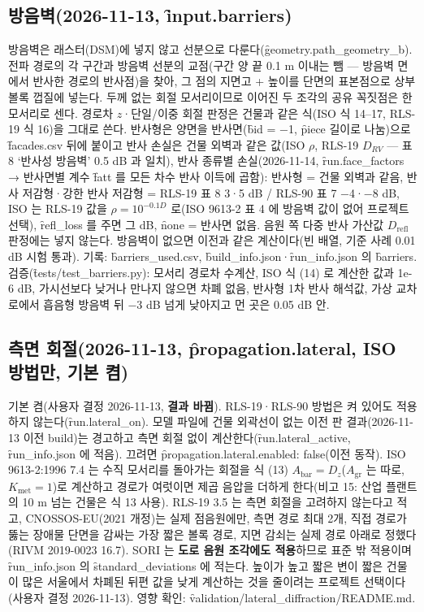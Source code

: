 \documentclass[10.5pt,a4paper]{article}
\begin{document}
\subsection{방음벽(2026-11-13, \f{input.barriers})}\label{sec:barrier}
방음벽은 래스터(DSM)에 넣지 않고 선분으로 다룬다(\f{geometry.path\_geometry\_b}). 전파 경로의 각 구간과 방음벽 선분의 교점(구간 양 끝 0.1 m 이내는 뺌 — 방음벽 면에서 반사한 경로의 반사점)을 찾아, 그 점의 지면고 + 높이를 단면의 표본점으로 상부 볼록 껍질에 넣는다. 두께 없는 회절 모서리이므로 이어진 두 조각의 공유 꼭짓점은 한 모서리로 센다. 경로차 $z$·단일/이중 회절 판정은 건물과 같은 식(ISO 식 14–17, RLS-19 식 16)을 그대로 쓴다. 반사형은 양면을 반사면(\f{bid} = −1, \f{piece} 길이로 나눔)으로 \f{facades.csv} 뒤에 붙이고 반사 손실은 건물 외벽과 같은 값(ISO $\rho$, RLS-19 $D_{RV}$ — 표 8 ‘반사성 방음벽’ 0.5 dB 과 일치), 반사 종류별 손실(2026-11-14, \f{run.face\_factors} → 반사면별 계수 \f{fatt} 를 모든 차수 반사 이득에 곱함): 반사형 = 건물 외벽과 같음, 반사 저감형·강한 반사 저감형 = RLS-19 표 8 3·5 dB / RLS-90 표 7 −4·−8 dB, ISO 는 RLS-19 값을 $\rho = 10^{-0.1 D}$ 로(ISO 9613-2 표 4 에 방음벽 값이 없어 프로젝트 선택), \f{refl\_loss} 를 주면 그 dB, \f{none} = 반사면 없음. 음원 쪽 다중 반사 가산값 $D_\mathrm{refl}$ 판정에는 넣지 않는다. 방음벽이 없으면 이전과 같은 계산이다(빈 배열, 기준 사례 0.01 dB 시험 통과). 기록: \f{barriers\_used.csv}, \f{build\_info.json}·\f{run\_info.json} 의 \f{barriers}. 검증(\f{tests/test\_barriers.py}): 모서리 경로차 수계산, ISO 식 (14) 로 계산한 값과 1e-6 dB, 가시선보다 낮거나 만나지 않으면 차폐 없음, 반사형 1차 반사 해석값, 가상 교차로에서 흡음형 방음벽 뒤 −3 dB 넘게 낮아지고 먼 곳은 0.05 dB 안.

\subsection{측면 회절(2026-11-13, \f{propagation.lateral}, ISO 방법만, 기본 켬)}\label{sec:lateral}
기본 켬(사용자 결정 2026-11-13, \textbf{결과 바뀜}). RLS-19·RLS-90 방법은 켜 있어도 적용하지 않는다(\f{run.lateral\_on}). 모델 파일에 건물 외곽선이 없는 이전 판 결과(2026-11-13 이전 build)는 경고하고 측면 회절 없이 계산한다(\f{run.lateral\_active}, \f{run\_info.json} 에 적음). 끄려면 \f{propagation.lateral.enabled: false}(이전 동작).
 ISO 9613-2:1996 7.4 는 수직 모서리를 돌아가는 회절을 식 (13) $A_\mathrm{bar} = D_z$($A_\mathrm{gr}$ 는 따로, $K_\mathrm{met} = 1$)로 계산하고 경로가 여럿이면 제곱 음압을 더하게 한다(비고 15: 산업 플랜트의 10 m 넘는 건물은 식 13 사용). RLS-19 3.5 는 측면 회절을 고려하지 않는다고 적고, CNOSSOS-EU(2021 개정)는 실제 점음원에만, 측면 경로 최대 2개, 직접 경로가 뚫는 장애물 단면을 감싸는 가장 짧은 볼록 경로, 지면 감쇠는 실제 경로 아래로 정했다(RIVM 2019-0023 16.7). SORI 는 \textbf{도로 음원 조각에도 적용}하므로 표준 밖 적용이며 \f{run\_info.json} 의 \f{standard\_deviations} 에 적는다. 높이가 높고 짧은 변이 짧은 건물이 많은 서울에서 차폐된 뒤편 값을 낮게 계산하는 것을 줄이려는 프로젝트 선택이다(사용자 결정 2026-11-13). 영향 확인: \f{validation/lateral\_diffraction/README.md}.
\end{document}
